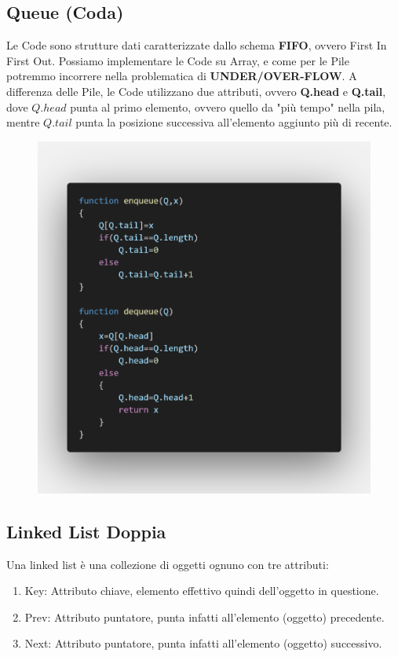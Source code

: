 \documentclass{article}
\begin{document}
\newpage

\subsection{Queue (Coda)}

Le Code sono strutture dati caratterizzate dallo schema \textbf{FIFO}, ovvero First In First Out. Possiamo implementare le Code su Array, e come per le Pile potremmo incorrere nella problematica di \textbf{UNDER/OVER-FLOW}. A differenza delle Pile, le Code utilizzano due attributi, ovvero \textbf{Q.head} e \textbf{Q.tail}, dove \(Q.head\) punta al primo elemento, ovvero quello da "più tempo" nella pila, mentre \(Q.tail\) punta la posizione successiva all'elemento aggiunto più di recente. 

\begin{figure}[htbp]
    \center
    \includegraphics[scale=0.25]{img/queueOperazioni.png}
\end{figure}

\newpage

\subsection{Linked List Doppia}

Una linked list è una collezione di oggetti ognuno con tre attributi:
\begin{enumerate}
    \item Key: Attributo chiave, elemento effettivo quindi dell'oggetto in questione.
    \item Prev: Attributo puntatore, punta infatti all'elemento (oggetto) precedente.
    \item Next: Attributo puntatore, punta infatti all'elemento (oggetto) successivo.
\end{enumerate}
\end{document}
